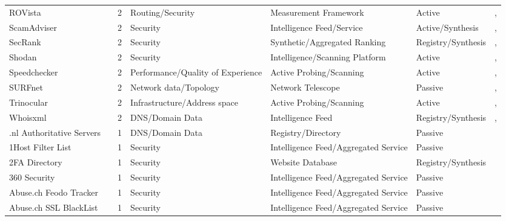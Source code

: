 \begin{table}[h!]
\begin{tabular}{lllllll}
ROVista & \cite{10.1145/3618257.3624806} & 2 & Routing/Security & Measurement Framework & Active & \cite{10.1145/3777912.3809144}, \cite{10.1145/3777912.3839812} \\
ScamAdviser & \cite{scamadviser} & 2 & Security & Intelligence Feed/Service & Active/Synthesis & \cite{10.1145/3618257.3624822}, \cite{10.1145/3777912.3839787} \\
SecRank & \cite{secrank} & 2 & Security & Synthetic/Aggregated Ranking & Registry/Synthesis & \cite{10.1145/3646547.3688449}, \cite{10.1145/3517745.3561444} \\
Shodan & \cite{shodan} & 2 & Security & Intelligence/Scanning Platform & Active & \cite{10.1145/3487552.3487833}, \cite{10.1145/3487552.3487835} \\
Speedchecker & \cite{speedchecker} & 2 & Performance/Quality of Experience & Active Probing/Scanning & Active & \cite{10.1145/3487552.3487854}, \cite{10.1145/3487552.3487862} \\
SURFnet & \cite{surfnet} & 2 & Network data/Topology & Network Telescope & Passive & \cite{10.1145/3777912.3839790}, \cite{10.1007/978-3-032-18268-5_14} \\
Trinocular & \cite{trinocular} & 2 & Infrastructure/Address space & Active Probing/Scanning & Active & \cite{10.1145/3618257.3624796}, \cite{10.1007/978-3-031-56252-5_7} \\
Whoisxml & \cite{xml} & 2 & DNS/Domain Data & Intelligence Feed & Registry/Synthesis & \cite{10.1145/3618257.3624805}, \cite{10.1007/978-3-032-18268-5_15} \\
.nl Authoritative Servers & \cite{nl_authoritative_servers} & 1 & DNS/Domain Data & Registry/Directory & Passive & \cite{10.1007/978-3-030-72582-2_27} \\
1Host Filter List & \cite{1host_filter} & 1 & Security & Intelligence Feed/Aggregated Service & Passive & \cite{10.1007/978-3-030-98785-5_19} \\
2FA Directory & \cite{2fa} & 1 & Security & Website Database & Registry/Synthesis & \cite{10.1007/978-3-032-18268-5_15} \\
360 Security & \cite{360_security} & 1 & Security & Intelligence Feed/Aggregated Service & Passive & \cite{10.1145/3618257.3624839} \\
Abuse.ch Feodo Tracker & \cite{abusech_feodo} & 1 & Security & Intelligence Feed/Aggregated Service & Passive & \cite{10.1007/978-3-031-28486-1_6} \\
Abuse.ch SSL BlackList & \cite{abusech_sslbl} & 1 & Security & Intelligence Feed/Aggregated Service & Passive & \cite{10.1007/978-3-031-28486-1_6} \\

\end{tabular}
\end{table}
